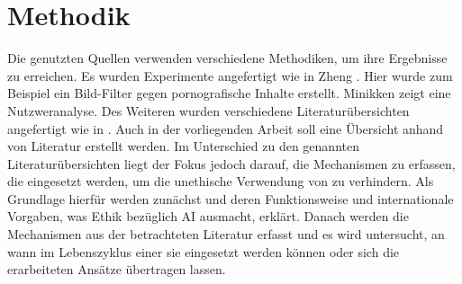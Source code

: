 \chapter{Methodik}

Die genutzten Quellen verwenden verschiedene Methodiken, um ihre Ergebnisse zu erreichen. Es wurden Experimente angefertigt wie in Zheng \cite{Zheng}. Hier wurde zum Beispiel ein Bild-Filter gegen pornografische Inhalte erstellt. Minikken \cite{Minkkinen} zeigt eine Nutzweranalyse. Des Weiteren wurden verschiedene Literaturübersichten angefertigt wie in \cite{Srinivasan} \cite{Jobin}. Auch in der vorliegenden Arbeit soll eine Übersicht anhand von Literatur erstellt werden. Im Unterschied zu den genannten Literaturübersichten liegt der Fokus jedoch darauf, die Mechanismen zu erfassen, die eingesetzt werden, um die unethische Verwendung von  zu verhindern. Als Grundlage hierfür werden zunächst  und deren Funktionsweise und internationale Vorgaben, was Ethik bezüglich AI ausmacht, erklärt. Danach werden die Mechanismen aus der betrachteten Literatur erfasst und es wird untersucht, an wann im Lebenszyklus einer  sie eingesetzt werden können oder sich die erarbeiteten Ansätze übertragen lassen.